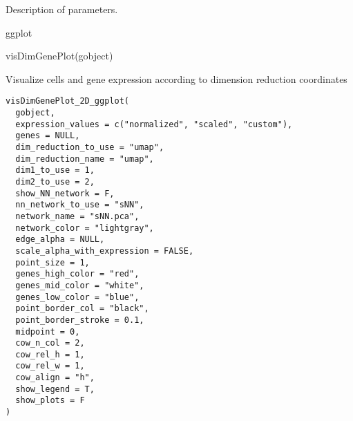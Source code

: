 \documentclass[a4paper]{book}
\begin{document}
%
\begin{Details}\relax
Description of parameters.
\end{Details}
%
\begin{Value}
ggplot
\end{Value}
%
\begin{Examples}
\begin{ExampleCode}
    visDimGenePlot(gobject)
\end{ExampleCode}
\end{Examples}
%
\begin{Description}\relax
Visualize cells and gene expression according to dimension reduction coordinates
\end{Description}
%
\begin{Usage}
\begin{verbatim}
visDimGenePlot_2D_ggplot(
  gobject,
  expression_values = c("normalized", "scaled", "custom"),
  genes = NULL,
  dim_reduction_to_use = "umap",
  dim_reduction_name = "umap",
  dim1_to_use = 1,
  dim2_to_use = 2,
  show_NN_network = F,
  nn_network_to_use = "sNN",
  network_name = "sNN.pca",
  network_color = "lightgray",
  edge_alpha = NULL,
  scale_alpha_with_expression = FALSE,
  point_size = 1,
  genes_high_color = "red",
  genes_mid_color = "white",
  genes_low_color = "blue",
  point_border_col = "black",
  point_border_stroke = 0.1,
  midpoint = 0,
  cow_n_col = 2,
  cow_rel_h = 1,
  cow_rel_w = 1,
  cow_align = "h",
  show_legend = T,
  show_plots = F
)
\end{verbatim}
\end{Usage}
%
\end{document}
